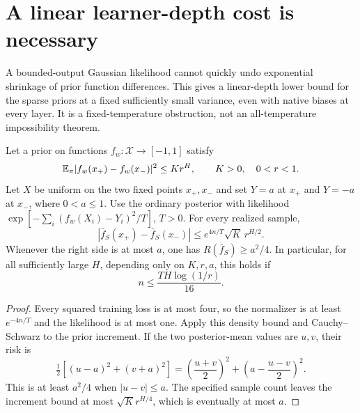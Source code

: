 \section{A linear learner-depth cost is necessary}
\label{sec:linear-depth-lower}
A bounded-output Gaussian likelihood cannot quickly undo exponential shrinkage of prior function differences. This gives a linear-depth lower bound for the sparse priors at a fixed sufficiently small variance, even with native biases at every layer. It is a fixed-temperature obstruction, not an all-temperature impossibility theorem.

\begin{lemma}
\label{lem:increment-learning-lower}
Let a prior on functions $f_w:\mathcal X\to[-1,1]$ satisfy
\[
 \mathbb E_\pi|f_w(x_+)-f_w(x_-)|^2\le K r^H,
 \qquad K>0,\quad0<r<1.
\]
Let $X$ be uniform on the two fixed points $x_+,x_-$ and set
$Y=a$ at $x_+$ and $Y=-a$ at $x_-$, where $0<a\le1$.
Use the ordinary posterior with likelihood
$\exp[-\sum_i(f_w(X_i)-Y_i)^2/T]$, $T>0$.
For every realized sample,
\[
 |\bar f_S(x_+)-\bar f_S(x_-)|\le
       e^{4n/T}\sqrt K\,r^{H/2}.
\]
Whenever the right side is at most $a$, one has $R(\bar f_S)\ge a^2/4$.
In particular, for all sufficiently large $H$, depending only on $K,r,a$, this holds if
\[
 n\le\frac{TH\log(1/r)}{16}.
\]
\end{lemma}
\begin{proof}
Every squared training loss is at most four, so the normalizer is at least $e^{-4n/T}$ and the likelihood is at most one. Apply this density bound and Cauchy--Schwarz to the prior increment. If the two posterior-mean values are $u,v$, their risk is
\[
 \tfrac12[(u-a)^2+(v+a)^2]
 =\left(\frac{u+v}{2}\right)^2+
       \left(a-\frac{u-v}{2}\right)^2.
\]
This is at least $a^2/4$ when $|u-v|\le a$. The specified sample count leaves the increment bound at most $\sqrt K r^{H/4}$, which is eventually at most $a$.
\end{proof}

